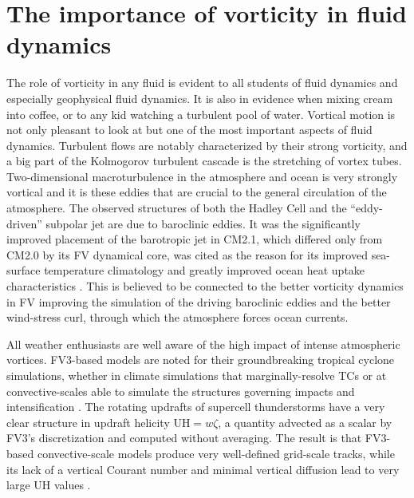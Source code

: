 \documentclass[10pt,letterpaper,margin=1in]{memoir}
\begin{document}

\section{The importance of vorticity in fluid dynamics} \label{sec:vorticity}

The role of vorticity in any fluid is evident to all students of fluid dynamics and especially geophysical fluid dynamics. It is also in evidence when mixing cream into coffee, or to any kid watching a turbulent pool of water. Vortical motion is not only pleasant to look at but one of the most important aspects of fluid dynamics. Turbulent flows are notably characterized by their strong vorticity, and a big part of the Kolmogorov turbulent cascade is the stretching of vortex tubes. Two-dimensional macroturbulence in the atmosphere and ocean is very strongly vortical and it is these eddies that are crucial to the general circulation of the atmosphere. The observed structures of both the Hadley Cell and the ``eddy-driven'' subpolar jet \citep[cf.]{Vallis2017} are due to baroclinic eddies. It was the significantly improved placement of the barotropic jet in CM2.1, which differed only from CM2.0 by its FV dynamical core, was cited as the reason for its improved sea-surface temperature climatology and greatly improved ocean heat uptake characteristics  \citep{Delworth2006}. This is believed to be connected to the better vorticity dynamics in FV improving the simulation of the driving baroclinic eddies and the better wind-stress curl, through which the atmosphere forces ocean currents.

All weather enthusiasts are well aware of the high impact of intense atmospheric vortices. FV3-based models are noted for their groundbreaking tropical cyclone simulations, whether in climate simulations that marginally-resolve TCs \citep{Zhao2009,ChenLin2013,Shaevitz2014,Murakami2015}
or at convective-scales able to simulate the structures governing impacts and intensification \citep{Gao2019,Gao2021,JHChen2018,Hazelton2018a,Hazelton2018b,Hazelton2020,Judt2021}. The rotating updrafts of supercell thunderstorms have a very clear structure in updraft helicity UH$=w\zeta$, a quantity advected as a scalar by FV3's discretization and computed without averaging. The result is that FV3-based convective-scale models produce very well-defined grid-scale tracks, while its lack of a vertical Courant number and minimal vertical diffusion lead to very large UH values \citep{AClark2018,Harris2019}. 
\end{document}
